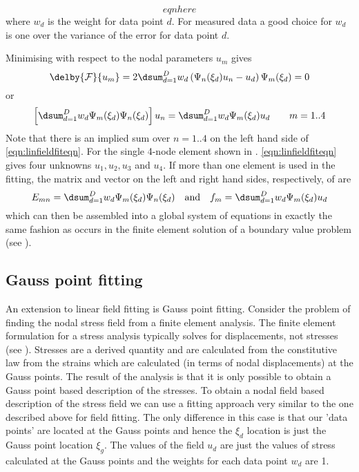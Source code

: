\begin{equation}
  eqn here
  \label{eqn:datasumsqs}
\end{equation}
where $w_{d}$ is the weight for data point $d$. For measured data a good
choice for $w_{d}$ is one over the variance of the error for data point $d$.

Minimising  with respect to the nodal parameters $u_{m}$
gives
\begin{equation}
  \delby{{\cal F}}{u_{m}}=2\dsum_{d=1}^{D}w_{d}\left(\Psi_n(\xi_{d})u_{n}-
    u_{d}\right)\Psi_m(\xi_{d}) = 0
\end{equation}
or
\begin{equation}
  \left[\dsum_{d=1}^{D}w_{d}\Psi_m(\xi_{d})\Psi_n(\xi_{d})\right]u_{n}=
  \dsum_{d=1}^{D}w_{d}\Psi_m(\xi_{d})u_{d} \quad \quad m=1..4
  \label{eqn:linfieldfiteqn}
\end{equation}
Note that there is an implied sum over $n=1..4$ on the left hand side of
\eqref{eqn:linfieldfiteqn}. For the single 4-node element shown in
. 
\eqref{eqn:linfieldfiteqn} gives four unknowns
$u_{1}, u_{2}, u_{3}$ and $u_{4}$. If more than one element is used in the
fitting, the matrix and vector on the left and right hand sides, respectively,
of  are
\begin{equation}
  E_{mn}=\dsum_{d=1}^{D}w_{d}\Psi_m(\xi_{d})\Psi_n(\xi_{d}) \quad \mbox{and} 
  \quad f_{m}=\dsum_{d=1}^{D}w_{d}\Psi_m(\xi_{d})u_{d}
\end{equation}
which can then be assembled into a global system of equations in exactly the
same fashion as occurs in the finite element solution of a boundary value
problem (see ).

\subsection{Gauss point fitting}

An extension to linear field fitting is Gauss point fitting. Consider the
problem of finding the nodal stress field from a finite element analysis. The
finite element formulation for a stress analysis typically solves for
displacements, not stresses (see ). Stresses are
a derived quantity and are calculated from the constitutive law from the
strains which are calculated (in terms of nodal displacements) at the Gauss
points. The result of the analysis is that it is only possible to obtain a
Gauss point based description of the stresses. To obtain a nodal field based
description of the stress field we can use a fitting approach very similar to
the one described above for field fitting. The only difference in this case is
that our 'data points' are located at the Gauss points and hence the $\xi_d$
location is just the Gauss point location $\xi_{g}$. The values of the field
$u_{d}$ are just the values of stress calculated at the Gauss points and the
weights for each data point $w_{d}$ are 1.

